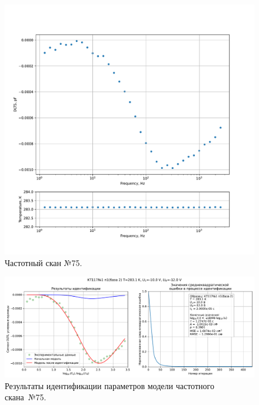 \begin{figure}[!ht]
    \centering
    \includegraphics[width=1\textwidth]{../plots/КТ117№1_п1(база 2)_2500Гц-1Гц_1пФ_+10С_-10В-12В_20мВ_20мкс_шаг_0,1.pdf}
    \caption{Частотный скан №75.}
    \label{pic:frequency_scan_75}
\end{figure}

\begin{figure}[!ht]
    \centering
    \includegraphics[width=1\textwidth]{../plots/КТ117№1_п1(база 2)_2500Гц-1Гц_1пФ_+10С_-10В-12В_20мВ_20мкс_шаг_0,1_model.pdf}
    \caption{Результаты идентификации параметров модели частотного скана~№75.}
    \label{pic:frequency_scan_model75}
\end{figure}

\pagebreak


